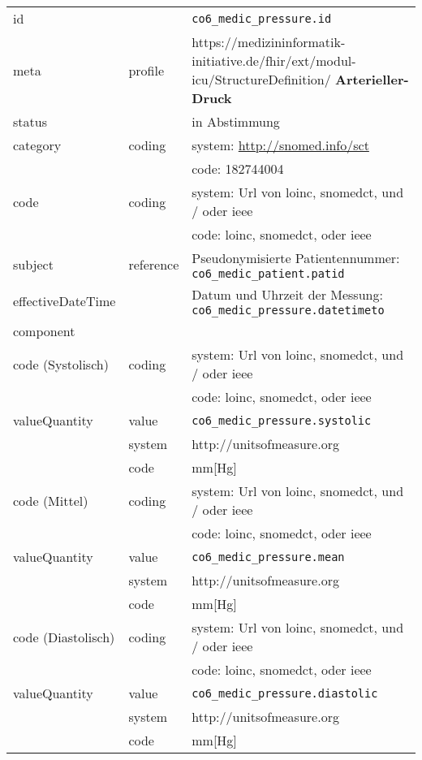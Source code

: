 \begin{longtable}{|l|l|p{7.5cm}|}
        \hline
        \rowcolor{lightgray} \multicolumn{3}{|l|}{Data Mapping (inhaltlich)} \\ \hline
        id &  & \texttt{co6\_medic\_pressure.id} \\ \hline
	meta & profile & https://medizininformatik-initiative.de/fhir/ext/modul-icu/StructureDefinition/\textbf{
Arterieller-Druck} \\ \hline 
	status &  & in Abstimmung  \\ \hline 
	category & coding & system: \url{http://snomed.info/sct} \\ 
\cline{3-3}
        & & code: 182744004 \\ \hline
        code & coding & system: Url von \ac{loinc}, \ac{snomedct}, und / oder \ac{ieee} \\
        \cline{3-3}
         &  & code: \ac{loinc}, \ac{snomedct}, oder \ac{ieee} \\ \hline
        subject & reference & Pseudonymisierte Patientennummer: \texttt{co6\_medic\_patient.patid} \\ \hline
        effectiveDateTime & & Datum und Uhrzeit der Messung:  \texttt{co6\_medic\_pressure.datetimeto} \\ \hline
	\multicolumn{3}{|l|}{component} \\ \hline
	code (Systolisch)  & coding & system: Url von \ac{loinc}, \ac{snomedct}, und / oder \ac{ieee} \\ 
	\cline{3-3} 
	&  & code: \ac{loinc}, \ac{snomedct}, oder \ac{ieee} \\ \hline	
	valueQuantity & value & \texttt{co6\_medic\_pressure.systolic} \\
	\cline{2-3}
	& system & http://unitsofmeasure.org \\ 
	\cline{2-3}
	& code & mm[Hg] \\ \hline
	code (Mittel)  & coding & system: Url von \ac{loinc}, \ac{snomedct}, und / oder \ac{ieee} \\ 
	\cline{3-3} 
	&  & code: \ac{loinc}, \ac{snomedct}, oder \ac{ieee} \\ \hline	
	valueQuantity & value & \texttt{co6\_medic\_pressure.mean} \\
	\cline{2-3}
	& system & http://unitsofmeasure.org \\ 
	\cline{2-3}
	& code &  mm[Hg] \\ \hline
	code (Diastolisch)  & coding & system: Url von \ac{loinc}, \ac{snomedct}, und / oder \ac{ieee} \\ 
	\cline{3-3} 
	&  & code: \ac{loinc}, \ac{snomedct}, oder \ac{ieee} \\ \hline	
	valueQuantity & value & \texttt{co6\_medic\_pressure.diastolic} \\
	\cline{2-3}
	& system & http://unitsofmeasure.org \\ 
	\cline{2-3}
	& code & mm[Hg] \\ \hline
\end{longtable}

